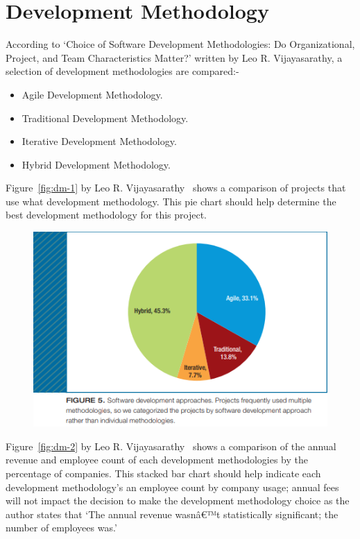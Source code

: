 \documentclass[12pt]{report} %
\begin{document}
	\chapter{Development Methodology}
		According to `Choice of Software Development Methodologies: Do Organizational, Project, and Team Characteristics Matter?' written by Leo R. Vijayasarathy, a selection of development methodologies are compared:-
		\begin{itemize}
			\item Agile Development Methodology.
			\item Traditional Development Methodology.
			\item Iterative Development Methodology.
			\item Hybrid Development Methodology.
		\end{itemize}
			
		Figure~\ref{fig:dm-1} by Leo R. Vijayasarathy~\cite{vijayasarathy_choice_2016} shows a comparison of projects that use what development methodology. This pie chart should help determine the best development methodology for this project.

		\begin{figure}[H]
			{\includegraphics[scale=0.45]{Figures/dm/dm-1.png}}
		\end{figure}

		Figure~\ref{fig:dm-2} by Leo R. Vijayasarathy~\cite{vijayasarathy_choice_2016} shows a comparison of the annual revenue and employee count of each development methodologies by the percentage of companies. This stacked bar chart should help indicate each development methodology's an employee count by company usage; annual fees will not impact the decision to make the development methodology choice as the author states that `The annual revenue wasnâ€™t statistically significant; the number of employees was.'~\cite{vijayasarathy_choice_2016}
\end{document}
